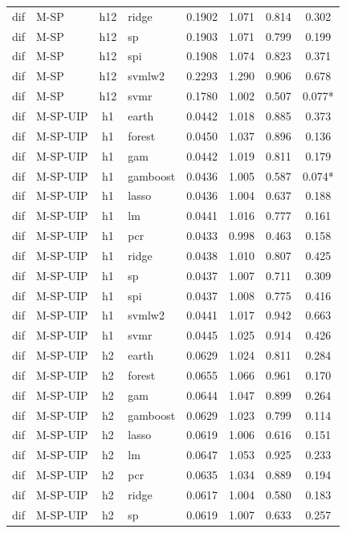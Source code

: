 \begin{ThreePartTable}
\begin{longtable}[t]{llclcccc}
dif & M-SP & h12 & ridge & 0.1902 & 1.071 & 0.814 & 0.302\\
dif & M-SP & h12 & sp & 0.1903 & 1.071 & 0.799 & 0.199\\
dif & M-SP & h12 & spi & 0.1908 & 1.074 & 0.823 & 0.371\\
dif & M-SP & h12 & svmlw2 & 0.2293 & 1.290 & 0.906 & 0.678\\
dif & M-SP & h12 & svmr & 0.1780 & 1.002 & 0.507 & 0.077*\\
\addlinespace
dif & M-SP-UIP & h1 & earth & 0.0442 & 1.018 & 0.885 & 0.373\\
dif & M-SP-UIP & h1 & forest & 0.0450 & 1.037 & 0.896 & 0.136\\
dif & M-SP-UIP & h1 & gam & 0.0442 & 1.019 & 0.811 & 0.179\\
dif & M-SP-UIP & h1 & gamboost & 0.0436 & 1.005 & 0.587 & 0.074*\\
dif & M-SP-UIP & h1 & lasso & 0.0436 & 1.004 & 0.637 & 0.188\\
dif & M-SP-UIP & h1 & lm & 0.0441 & 1.016 & 0.777 & 0.161\\
dif & M-SP-UIP & h1 & pcr & 0.0433 & 0.998 & 0.463 & 0.158\\
dif & M-SP-UIP & h1 & ridge & 0.0438 & 1.010 & 0.807 & 0.425\\
dif & M-SP-UIP & h1 & sp & 0.0437 & 1.007 & 0.711 & 0.309\\
dif & M-SP-UIP & h1 & spi & 0.0437 & 1.008 & 0.775 & 0.416\\
dif & M-SP-UIP & h1 & svmlw2 & 0.0441 & 1.017 & 0.942 & 0.663\\
dif & M-SP-UIP & h1 & svmr & 0.0445 & 1.025 & 0.914 & 0.426\\
\addlinespace
dif & M-SP-UIP & h2 & earth & 0.0629 & 1.024 & 0.811 & 0.284\\
dif & M-SP-UIP & h2 & forest & 0.0655 & 1.066 & 0.961 & 0.170\\
dif & M-SP-UIP & h2 & gam & 0.0644 & 1.047 & 0.899 & 0.264\\
dif & M-SP-UIP & h2 & gamboost & 0.0629 & 1.023 & 0.799 & 0.114\\
dif & M-SP-UIP & h2 & lasso & 0.0619 & 1.006 & 0.616 & 0.151\\
dif & M-SP-UIP & h2 & lm & 0.0647 & 1.053 & 0.925 & 0.233\\
dif & M-SP-UIP & h2 & pcr & 0.0635 & 1.034 & 0.889 & 0.194\\
dif & M-SP-UIP & h2 & ridge & 0.0617 & 1.004 & 0.580 & 0.183\\
dif & M-SP-UIP & h2 & sp & 0.0619 & 1.007 & 0.633 & 0.257\\

\end{longtable}
\end{ThreePartTable}
